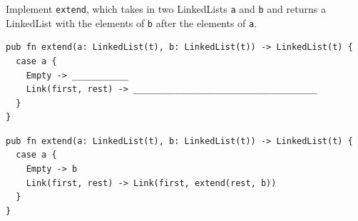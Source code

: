 \begin{blocksection}
\question Implement \texttt{extend}, which takes in two LinkedLists \texttt{a} and \texttt{b} and returns a LinkedList with the elements of \texttt{b} after the elements of \texttt{a}.
\begin{lstlisting}
pub fn extend(a: LinkedList(t), b: LinkedList(t)) -> LinkedList(t) {
  case a {
    Empty -> ___________
    Link(first, rest) -> ____________________________________
  }
}
\end{lstlisting}

\begin{solution}
\begin{lstlisting}
pub fn extend(a: LinkedList(t), b: LinkedList(t)) -> LinkedList(t) {
  case a {
    Empty -> b
    Link(first, rest) -> Link(first, extend(rest, b))
  }
}
\end{lstlisting}
\end{solution}
\end{blocksection}
